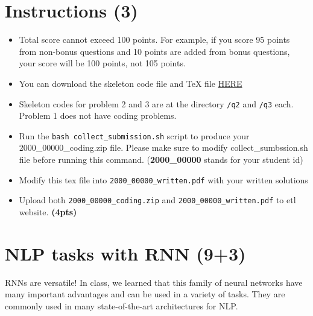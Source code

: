 \documentclass{assignment format}
\begin{document}
\begin{center}

\end{center}

\section{Instructions (3)}
\begin{itemize}
\item Total score cannot exceed 100 points. For example, if you score 95 points from non-bonus questions and 10 points are added from bonus questions, your score will be 100 points, not 105 points.
\item You can download the skeleton code file and TeX file \href{https://github.com/yc-song/gsds-nlp-assignment-2/main}{HERE} 
\item Skeleton codes for problem 2 and 3 are at the directory \texttt{/q2} and \texttt{/q3} each. Problem 1 does not have coding problems. 
\item Run the \texttt{bash collect\_submission.sh} script to produce your 2000\_00000\_coding.zip file. Please make sure to modify collect\_sumbssion.sh file before running this command. (\textbf{2000\_00000} stands for your student id)
\item Modify this tex file into \texttt{2000\_00000\_written.pdf} with your written solutions
\item Upload both \texttt{2000\_00000\_coding.zip} and \texttt{2000\_00000\_written.pdf} to etl website. \textbf{(4pts)}
\end{itemize}



\section{NLP tasks with RNN (9+3)}
RNNs are versatile! In class, we learned that this family of neural networks have many important advantages and can be used in a variety of tasks. They are commonly used in many state-of-the-art architectures for NLP.
\end{document}
